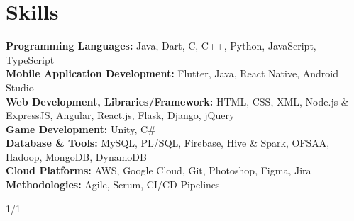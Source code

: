\documentclass[10pt, legalpaper]{article}
\newenvironment{onecolentry}{
    \par\noindent
}{
    \par
}
\begin{document}
\section{Skills}
\begin{onecolentry}

\textbf{Programming Languages:} Java, Dart, C, C++, Python, JavaScript, TypeScript \\
\textbf{Mobile Application Development:} Flutter, Java, React Native, Android Studio \\
\textbf{Web Development, Libraries/Framework:} HTML, CSS, XML, Node.js \& ExpressJS, Angular, React.js, Flask, Django, jQuery \\
\textbf{Game Development:} Unity, C\# \\
\textbf{Database \& Tools:} MySQL, PL/SQL, Firebase, Hive \& Spark, OFSAA, Hadoop, MongoDB, DynamoDB \\
\textbf{Cloud Platforms:} AWS, Google Cloud, Git, Photoshop, Figma, Jira \\
\textbf{Methodologies:} Agile, Scrum, CI/CD Pipelines

\end{onecolentry}

\vspace{0.5 cm}
\begin{onecolentry}
    \centering
    {1/1}
\end{onecolentry}
\end{document}
